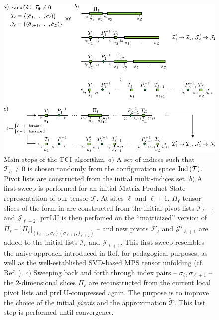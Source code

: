 \begin{figure}[ht!]
	\centering
	\includegraphics[width=\textwidth]{figures/TCI.pdf}
	\caption{Main steps of the TCI algorithm. $a)$ A set of indices such that $\mathcal{T}_{\hat \sigma} \neq 0$ is chosen randomly from the configuration space $\text{Ind}\left(\mathcal{T}\right)$. Pivot lists are constructed from the initial multi-indices set. $b)$ A first sweep is performed for an initial Matrix Product State representation of our tensor $\mathcal{T}$. At sites $\ell$ and $\ell+1$, $\Pi_\ell$ tensor slices of the form in  are constructed from the initial pivot lists $\mathcal{I}_{\ell-1}$ and $\mathcal{J}_{\ell+2}$. prrLU is then perfomed on the ``matricized'' version of $\Pi_\ell$ -- $\bigl[\Pi_\ell\bigr]_{(i_{\ell -1}, \sigma_\ell) (\sigma_{\ell+1}, j_{\ell +2})}$ -- and new pivots $\mathcal{I}'_\ell$ and $\mathcal{J}'_{\ell+1}$ are added to the initial lists $\mathcal{I}_\ell$ and $\mathcal{J}_{\ell+1}$. This first sweep resembles the naive approach introduced in Ref. \cite{Fernandez2022} for pedagogical purposes, as well as the well-established SVD-based MPS tensor unfolding (cf. Ref. \cite{vonDelftTNNotes}). $c)$ Sweeping back and forth through index pairs -- $\sigma_\ell, \sigma_{\ell +1}$ -- the 2-dimensional slices $\Pi_\ell$ are reconstructed from the current local pivot lists and prrLU-compressed again. The purpose is to improve the choice of the initial \textit{pivots} and the approximation $\widetilde{\mathcal{T}}$. This last step is performed until convergence.}
	\label{fig:TCIalg}
\end{figure}

